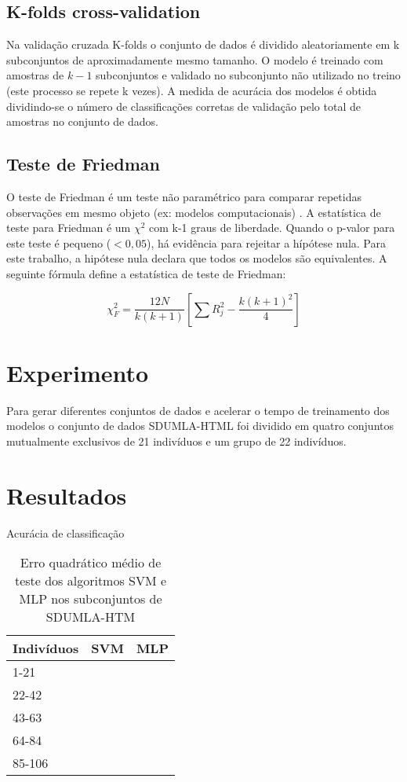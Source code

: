 \documentclass[conference]{IEEEtran}
\begin{document}
\subsection{K-folds cross-validation}
Na validação cruzada K-folds o conjunto de dados é dividido aleatoriamente em k subconjuntos de aproximadamente mesmo tamanho. O modelo é treinado com amostras de $k-1$ subconjuntos e validado no subconjunto não utilizado no treino (este processo se repete k vezes). A medida de acurácia dos modelos é obtida dividindo-se o número de classificações corretas de validação pelo total de amostras no conjunto de dados.

\subsection{Teste de Friedman}
O teste de Friedman é um teste não paramétrico para comparar repetidas observações em mesmo objeto (ex: modelos computacionais) \cite{demvsar2006statistical,settouti2016statistical}. A estatística de teste para Friedman é um $\chi^2$ com k-1 graus de liberdade. Quando o p-valor para este teste é pequeno ($< 0,05$), há evidência para rejeitar a hípótese nula. Para este trabalho, a hipótese nula declara que todos os modelos são equivalentes. A seguinte fórmula define a estatística de teste de Friedman:

\[\chi_{F}^{2} = \frac{12N}{k(k+1)}[\sum{R_{j}^{2} - \frac{k(k+1)^2}{4}}]\]

\section{Experimento}
Para gerar diferentes conjuntos de dados e acelerar o tempo de treinamento dos modelos o conjunto de dados SDUMLA-HTML foi dividido em quatro conjuntos mutualmente exclusivos de 21 indivíduos e um grupo de 22 indivíduos.


\section{Resultados}
Acurácia de classificação

\begin{table}[!t]
\caption{Erro quadrático médio de teste dos algoritmos SVM e MLP nos subconjuntos de SDUMLA-HTM}
\centering
\begin{tabular}{lcc}
\hline
Indivíduos & SVM & MLP \\
\hline
1-21   &  & \\
22-42  &  & \\
43-63  &  & \\
64-84  &  & \\
85-106 &  & \\
\end{tabular}
\end{table}
\end{document}
